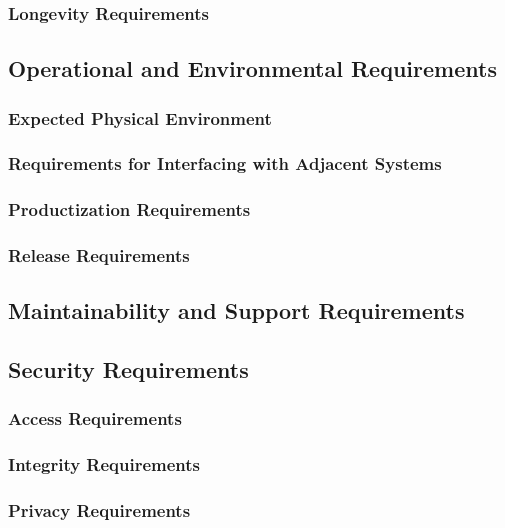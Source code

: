 \documentclass[12pt, titlepage]{article}
\begin{document}
\subsubsection{Longevity Requirements}


\subsection{Operational and Environmental Requirements}

\subsubsection{Expected Physical Environment}


\subsubsection{Requirements for Interfacing with Adjacent Systems}


\subsubsection{Productization Requirements}


\subsubsection{Release Requirements}


\newpage
\subsection{Maintainability and Support Requirements}



\subsection{Security Requirements}
\subsubsection{Access Requirements}


\subsubsection{Integrity Requirements}



\subsubsection{Privacy Requirements}
\end{document}
